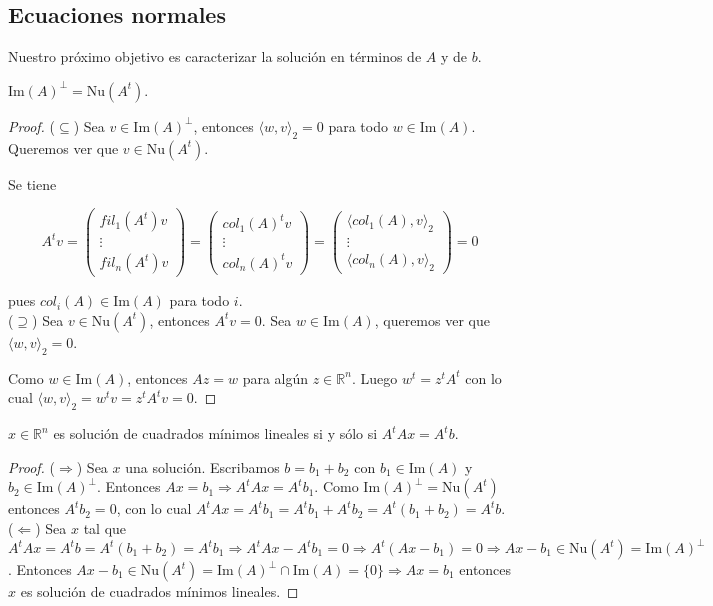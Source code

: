\subsection{Ecuaciones normales}

Nuestro próximo objetivo es caracterizar la solución en términos de $A$ y de $b$.

\begin{lema}
$\text{Im}(A)^{\perp} = \text{Nu}(A^t)$.

\begin{proof}
($\subseteq$) Sea $v \in \text{Im}(A)^{\perp}$, entonces $\langle w, v \rangle_2 = 0$ para todo $w \in \text{Im}(A)$. Queremos ver que $v \in \text{Nu}(A^t)$.

Se tiene

\[A^tv = \begin{pmatrix}
fil_1(A^t)v\\
\vdots\\
fil_n(A^t) v
\end{pmatrix} = \begin{pmatrix}
col_1(A)^t v\\
\vdots\\
col_n(A)^t v
\end{pmatrix} = \begin{pmatrix}
\langle col_1(A), v \rangle_2\\
\vdots\\
\langle col_n(A), v \rangle_2
\end{pmatrix} = 0\]

pues $col_i(A) \in \text{Im}(A)$ para todo $i$.\\[0.25cm]

($\supseteq$) Sea $v \in \text{Nu}(A^t)$, entonces $A^tv = 0$. Sea $w \in \text{Im}(A)$, queremos ver que $\langle w, v \rangle_2 = 0$.

Como $w \in \text{Im}(A)$, entonces $Az = w$ para algún $z \in \mathbb{R}^n$. Luego $w^t = z^tA^t$ con lo cual $\langle w, v \rangle_2 = w^tv = z^tA^tv = 0$. 
\end{proof}
\end{lema}

\begin{propo}
$x \in \mathbb{R}^{n}$ es solución de cuadrados mínimos lineales si y sólo si $A^tAx = A^tb$.

\begin{proof}
($\Rightarrow$) Sea $x$ una solución. Escribamos $b = b_1 + b_2$ con $b_1 \in \text{Im}(A)$ y $b_2 \in \text{Im}(A)^{\perp}$. Entonces $Ax = b_1 \Rightarrow A^tAx = A^tb_1$. Como $\text{Im}(A)^{\perp} = \text{Nu}(A^t)$ entonces $A^tb_2 = 0$, con lo cual $A^tAx = A^tb_1 = A^tb_1 + A^tb_2 = A^t(b_1 + b_2) = A^tb$.\\[0.25cm]

($\Leftarrow$) Sea $x$ tal que $A^tAx = A^tb = A^t(b_1 + b_2) = A^tb_1 \Rightarrow A^tAx - A^tb_1 = 0 \Rightarrow A^t(Ax - b_1) = 0 \Rightarrow Ax - b_1 \in \text{Nu}(A^t) = \text{Im}(A)^{\perp}$. Entonces $Ax - b_1 \in \text{Nu}(A^t) = \text{Im}(A)^{\perp} \cap \text{Im}(A) = \{0\} \Rightarrow Ax = b_1$ entonces $x$ es solución de cuadrados mínimos lineales.
\end{proof}
\end{propo}

